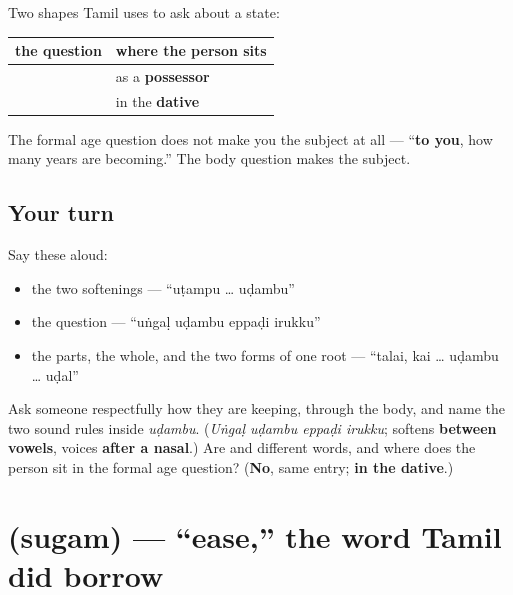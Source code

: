 \begin{grammarlens}[title={Grammar Lens: where the person goes in a health question}]
Two shapes Tamil uses to ask about a state:

\noindent
\begin{tabularx}{\linewidth}{@{}>{\raggedright\arraybackslash}X>{\raggedright\arraybackslash}X@{}}
\toprule
\textbf{the question} & \textbf{where the person sits} \\
\midrule
\textbf{\ta{உங்கள்} \ta{உடம்பு} \ta{எப்படி} \ta{இருக்கு}} & as a \textbf{possessor} \\
\textbf{\ta{உனக்கு} \ta{எத்தனை} \ta{வயது} \ta{ஆகிறது}} & in the \textbf{dative} \\
\bottomrule
\end{tabularx}

The formal age question does not make you the subject at all — \textquotedblleft{}\textbf{to you}, how many years are becoming.\textquotedblright{} The body question makes \textbf{} the subject.
\end{grammarlens}

\subsection*{Your turn}
Say these aloud:

\begin{itemize}
\raggedright
  \item the two softenings — \textquotedblleft{}uṭampu … uḍambu\textquotedblright{}
  \item the question — \textquotedblleft{}uṅgaḷ uḍambu eppaḍi irukku\textquotedblright{}
  \item the parts, the whole, and the two forms of one root — \textquotedblleft{}talai, kai … uḍambu … uḍal\textquotedblright{}
\end{itemize}

\begin{tcolorbox}[breakable,colback=teal!4,colframe=teal!35!black,title={Before you move on}]
Ask someone respectfully how they are keeping, through the body, and name the two sound rules inside \emph{uḍambu}. (\emph{Uṅgaḷ uḍambu eppaḍi irukku}; \textbf{} softens \textbf{between vowels}, \textbf{} voices \textbf{after a nasal}.) Are \textbf{} and \textbf{} different words, and where does the person sit in the formal age question? (\textbf{No}, same entry; \textbf{in the dative}.)
\end{tcolorbox}
\section[\texorpdfstring{\ta{சுகம்} (sugam)}{சுகம் (sugam)}]{ (sugam) — \textquotedblleft{}ease,\textquotedblright{} the word Tamil did borrow}

